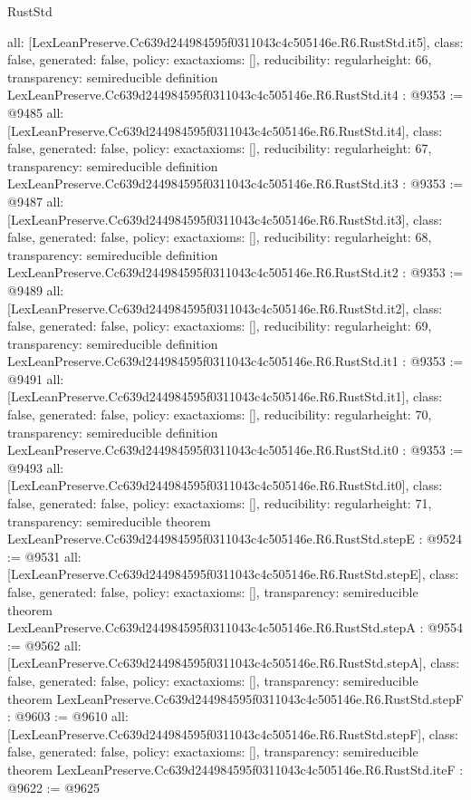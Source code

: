 \begin{lexlean}{RustStd}
\begin{coremodule}
{  all: [LexLeanPreserve.Cc639d244984595f0311043c4c505146e.R6.RustStd.it5],
  class: false,
  generated: false,
  policy: exact{axioms: []},
  reducibility: regular{height: 66},
  transparency: semireducible
}
definition LexLeanPreserve.Cc639d244984595f0311043c4c505146e.R6.RustStd.it4 : @9353 := @9485 {
  all: [LexLeanPreserve.Cc639d244984595f0311043c4c505146e.R6.RustStd.it4],
  class: false,
  generated: false,
  policy: exact{axioms: []},
  reducibility: regular{height: 67},
  transparency: semireducible
}
definition LexLeanPreserve.Cc639d244984595f0311043c4c505146e.R6.RustStd.it3 : @9353 := @9487 {
  all: [LexLeanPreserve.Cc639d244984595f0311043c4c505146e.R6.RustStd.it3],
  class: false,
  generated: false,
  policy: exact{axioms: []},
  reducibility: regular{height: 68},
  transparency: semireducible
}
definition LexLeanPreserve.Cc639d244984595f0311043c4c505146e.R6.RustStd.it2 : @9353 := @9489 {
  all: [LexLeanPreserve.Cc639d244984595f0311043c4c505146e.R6.RustStd.it2],
  class: false,
  generated: false,
  policy: exact{axioms: []},
  reducibility: regular{height: 69},
  transparency: semireducible
}
definition LexLeanPreserve.Cc639d244984595f0311043c4c505146e.R6.RustStd.it1 : @9353 := @9491 {
  all: [LexLeanPreserve.Cc639d244984595f0311043c4c505146e.R6.RustStd.it1],
  class: false,
  generated: false,
  policy: exact{axioms: []},
  reducibility: regular{height: 70},
  transparency: semireducible
}
definition LexLeanPreserve.Cc639d244984595f0311043c4c505146e.R6.RustStd.it0 : @9353 := @9493 {
  all: [LexLeanPreserve.Cc639d244984595f0311043c4c505146e.R6.RustStd.it0],
  class: false,
  generated: false,
  policy: exact{axioms: []},
  reducibility: regular{height: 71},
  transparency: semireducible
}
theorem LexLeanPreserve.Cc639d244984595f0311043c4c505146e.R6.RustStd.stepE : @9524 := @9531 {
  all: [LexLeanPreserve.Cc639d244984595f0311043c4c505146e.R6.RustStd.stepE],
  class: false,
  generated: false,
  policy: exact{axioms: []},
  transparency: semireducible
}
theorem LexLeanPreserve.Cc639d244984595f0311043c4c505146e.R6.RustStd.stepA : @9554 := @9562 {
  all: [LexLeanPreserve.Cc639d244984595f0311043c4c505146e.R6.RustStd.stepA],
  class: false,
  generated: false,
  policy: exact{axioms: []},
  transparency: semireducible
}
theorem LexLeanPreserve.Cc639d244984595f0311043c4c505146e.R6.RustStd.stepF : @9603 := @9610 {
  all: [LexLeanPreserve.Cc639d244984595f0311043c4c505146e.R6.RustStd.stepF],
  class: false,
  generated: false,
  policy: exact{axioms: []},
  transparency: semireducible
}
theorem LexLeanPreserve.Cc639d244984595f0311043c4c505146e.R6.RustStd.iteF : @9622 := @9625 {
}
\end{coremodule}
\end{lexlean}
